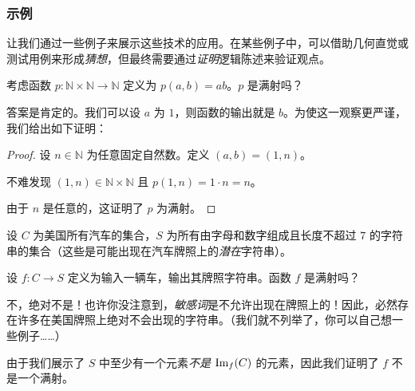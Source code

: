 \subsubsection*{示例}

让我们通过一些例子来展示这些技术的应用。在某些例子中，可以借助几何直觉或测试用例来形成\emph{猜想}，但最终需要通过\emph{证明}逻辑陈述来验证观点。\\

\begin{example}
    考虑函数 $p : \mathbb{N} \times \mathbb{N} \to \mathbb{N}$ 定义为 $p(a,b) = ab$。$p$ 是满射吗？

    答案是肯定的。我们可以设 $a$ 为 $1$，则函数的输出就是 $b$。为使这一观察更严谨，我们给出如下证明：

    \begin{proof}
        设 $n \in \mathbb{N}$ 为任意固定自然数。定义 $(a, b) = (1, n)$。

        不难发现 $(1, n) \in \mathbb{N} \times \mathbb{N}$ 且 $p(1, n) = 1 \cdot n = n$。

        由于 $n$ 是任意的，这证明了 $p$ 为满射。
    \end{proof}
\end{example}

\begin{example}
    设 $C$ 为美国所有汽车的集合，$S$ 为所有由字母和数字组成且长度不超过 $7$ 的字符串的集合（这些是可能出现在汽车牌照上的\emph{潜在}字符串）。

    设 $f : C \to S$ 定义为输入一辆车，输出其牌照字符串。函数 $f$ 是满射吗？

    不，绝对不是！也许你没注意到，\emph{敏感词}是不允许出现在牌照上的！因此，必然存在许多在美国牌照上绝对不会出现的字符串。（我们就不列举了，你可以自己想一些例子……）

    由于我们展示了 $S$ 中至少有一个元素\emph{不是} $\text{Im}_f (C)$ 的元素，因此我们证明了 $f$ 不是一个满射。
\end{example}

